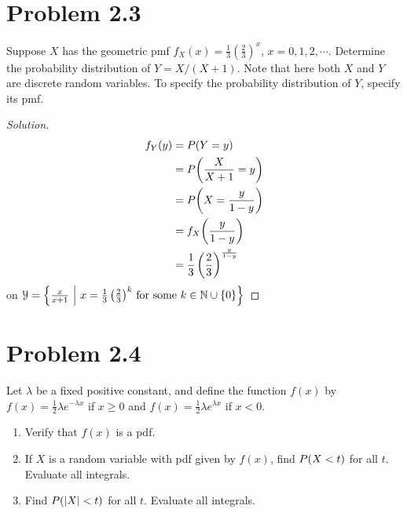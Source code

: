\documentclass[12pt,letterpaper,reqno]{amsart}
\numberwithin{equation}{subsection}
\begin{document}
\newpage
\section{Problem 2.3}

Suppose $X$ has the geometric pmf $f_X(x) = \frac{1}{3} \left( \frac{2}{3} \right)^x$, $x = 0, 1, 2, \cdots$. Determine the probability distribution of $Y = X/(X+1)$. Note that here both $X$ and $Y$ are discrete random variables. To specify the probability distribution of $Y$, specify its pmf.

\begin{proof}[Solution]

\begin{align*}
    {f_Y}\! \left( {y} \right) &= {P}\! \left( {Y = y} \right) \\
                 &= {P}\! \left( {\frac{X}{X+1} = y} \right) \\
                 &= {P}\! \left( {X = \frac{y}{1-y}} \right) \\
                 &= {f_X}\! \left( {\frac{y}{1-y}} \right) \\
                 &= \frac{1}{3} \left( \frac{2}{3} \right)^{\frac{y}{1-y}}
\end{align*}
on $\mathcal{{Y}} = \left\{ {\frac{x}{x+1}} \ \middle| \ {\mbox{$x = \frac{1}{3} \left( \frac{2}{3} \right)^k$ for some $k \in \mathbb{N} \cup \left\{ {0} \right\}$}} \right\}$
\end{proof}

\newpage
\section{Problem 2.4}

Let $\lambda$ be a fixed positive constant, and define the function $f(x)$ by $f(x) = \frac{1}{2} \lambda e^{-\lambda x}$ if $x \geq 0$ and $f(x) = \frac{1}{2} \lambda e^{\lambda x}$ if $x < 0$.

\begin{enumerate}[label=(\alph*),leftmargin=*]
    \item Verify that $f(x)$ is a pdf.
    \item If $X$ is a random variable with pdf given by $f(x)$, find ${P}\! \left( {X < t} \right)$ for all $t$. Evaluate all integrals.
    \item Find ${P}\! \left( {\left\lvert{X}\right\rvert < t} \right)$ for all $t$. Evaluate all integrals.
\end{enumerate}~\\
\end{document}
